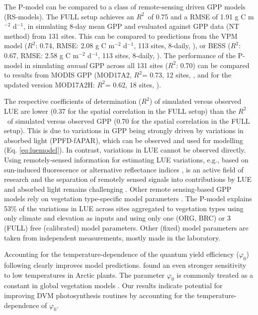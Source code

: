 \documentclass[gmd, manuscript]{copernicus}
\newcommand{\rsq}{$R^2$}
\begin{document}
The P-model can be compared to a class of remote-sensing driven GPP models (RS-models). The FULL setup achieves an \rsq\ of 0.75 and a RMSE of 1.91 g C m$^{-2}$ d$^{-1}$, in simulating 8-day mean GPP and evaluated against GPP data (NT method) from 131 sites. This can be compared to predictions from the VPM model (\rsq : 0.74, RMSE: 2.08 g C m$^{-2}$ d$^{-1}$, 113 sites, 8-daily, \citet{Zhang2017-yr}), or BESS (\rsq : 0.67, RMSE: 2.58 g C m$^{-2}$ d$^{-1}$, 113 sites, 8-daily, \citet{jiang16rse}). The performance of the P-model in simulating \textit{annual} GPP across all 131 sites (\rsq : 0.70) can be compared to results from MODIS GPP (MOD17A2, \rsq = 0.73, 12 sites, \citet{heinsch06}, and for the updated version MOD17A2H: \rsq = 0.62, 18 sites, \citet{wang17rs}). 

The respective coefficients of determination (\rsq ) of simulated versus observed LUE are lower (0.37 for the spatial correlation in the FULL setup) than the \rsq\ of simulated versus observed GPP (0.70 for the spatial correlation in the FULL setup). This is due to variations in GPP being strongly driven by variations in absorbed light (PPFD$\cdot$fAPAR), which can be observed and used for modelling (Eq. \ref{eq:luemodel}). In contrast, variations in LUE cannot be observed directly. Using remotely-sensed information for estimating LUE variations, e.g., based on sun-induced fluorescence \citep{frankenberg18, li18gcb, ryu19rse} or alternative reflectance indices \citep{gamon92, gamon16pnas, Badgley2017-tw}, is an active field of research and the separation of remotely sensed signals into contributions by LUE and absorbed light remains challenging \citep{porcarcastell14, ryu19rse}. Other remote sensing-based GPP models rely on vegetation type-specific model parameters \citep{Zhang2017-yr, running04, jiang16rse}. The P-model explains 53\% of the variations in LUE across sites aggregated to vegetation types using only climate and elevation as inputs and using only one (ORG, BRC) or 3 (FULL) free (calibrated) model parameters. Other (fixed) model parameters are taken from independent measurements, mostly made in the laboratory. %

Accounting for the temperature-dependence of the quantum yield efficiency ($\varphi_0$) following \citet{bernacchi03pce} clearly improves model predictions. \citet{rogers19newphyt} found an even stronger sensitivity to low temperatures in Arctic plants. The parameter $\varphi_0$ is commonly treated as a constant in global vegetation models \citep{rogers17}. Our results indicate potential for improving DVM photosynthesis routines by accounting for the temperature-dependence of $\varphi_0$. 
\end{document}
